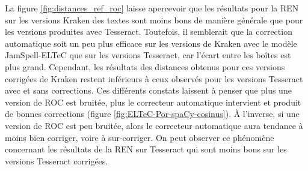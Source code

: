 La figure \ref{fig:distances_ref_roc} laisse apercevoir que les résultats pour la REN sur les versions Kraken des textes sont moins bons de manière générale que pour les versions produites avec Tesseract. Toutefois, il semblerait que la correction automatique soit un peu plus efficace sur les versions de Kraken avec le modèle JamSpell-ELTeC que sur les versions Tesseract, car l'écart entre les boîtes est plus grand. Cependant, les résultats des distances obtenus pour ces versions corrigées de Kraken restent inférieurs à ceux observés pour les versions Tesseract avec et sans corrections. Ces différents constats laissent à penser que plus une version de ROC est bruitée, plus le correcteur automatique intervient et produit de bonnes corrections (figure \ref{fig:ELTeC-Por-spaCy-cosinus}). À l'inverse, si une version de ROC est peu bruitée, alors le correcteur automatique aura tendance à moins bien corriger, voire à sur-corriger. On peut observer ce phénomène concernant les résultats de la REN sur Tesseract qui sont moins bons sur les versions Tesseract corrigées. 




